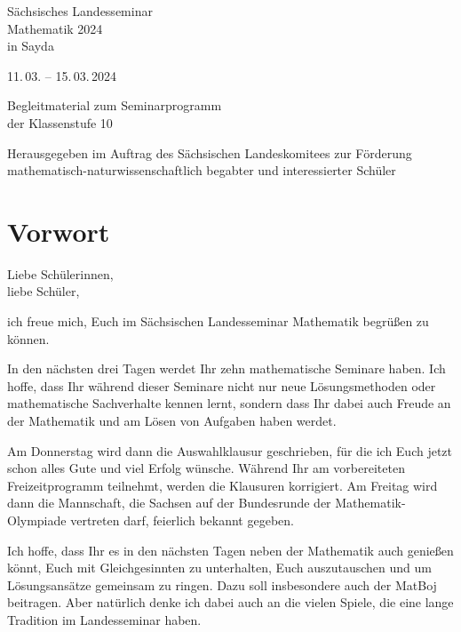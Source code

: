 \documentclass[a4paper, 12pt]{article}
\begin{document}
	\begin{titlepage}
		\centering\sffamily\Huge\bfseries
		\vspace*{0.75em}
		
		Sächsisches Landesseminar \\
		Mathematik 2024 \\
		\textmd{in Sayda} \\
		
		\vspace{1.75em}
		
		\textmd{\large 11.\,03. -- 15.\,03.\,2024} \\
		
		\vspace{6em}
		
		Begleitmaterial zum Seminarprogramm\\[.6\baselineskip]
		der Klassenstufe 10\\
		
		\vfill
		
		\raggedright\normalfont\normalsize
		Herausgegeben im Auftrag des Sächsischen Landeskomitees zur Förderung \\
		mathematisch-naturwissenschaftlich begabter und interessierter Schüler
	\end{titlepage}
	\setcounter{page}{2}
	
	\section*{Vorwort}
	
	Liebe Schülerinnen,\\
	liebe Schüler,
	
	ich freue mich, Euch im Sächsischen Landesseminar Mathematik begrüßen zu können.
	
	In den nächsten drei Tagen werdet Ihr zehn mathematische Seminare haben. Ich hoffe, dass Ihr während dieser Seminare nicht nur neue Lösungsmethoden oder mathematische Sachverhalte kennen lernt, sondern dass Ihr dabei auch Freude an der Mathematik und am Lösen von Aufgaben haben werdet.
	
	Am Donnerstag wird dann die Auswahlklausur geschrieben, für die ich Euch jetzt schon alles Gute und viel Erfolg wünsche. Während Ihr am vorbereiteten Freizeitprogramm teilnehmt, werden die Klausuren korrigiert. Am Freitag wird dann die Mannschaft, die Sachsen auf der Bundesrunde der Mathematik-Olympiade vertreten darf, feierlich bekannt gegeben.
	
	Ich hoffe, dass Ihr es in den nächsten Tagen neben der Mathematik auch genießen könnt, Euch mit Gleichgesinnten zu unterhalten, Euch auszutauschen und um Lösungsansätze gemeinsam zu ringen. Dazu soll insbesondere auch der MatBoj beitragen. Aber natürlich denke ich dabei auch an die vielen Spiele, die eine lange Tradition im Landesseminar haben.
	
\end{document}
